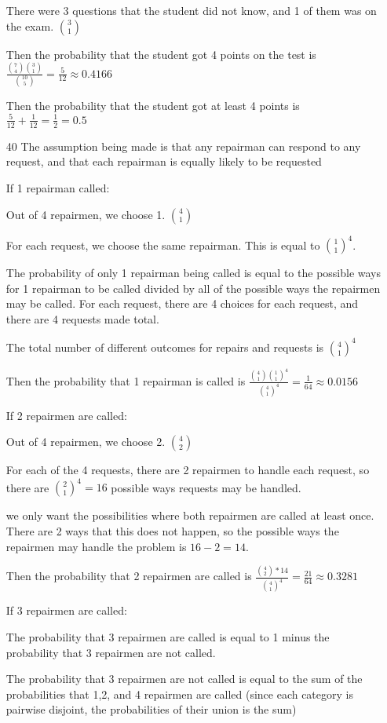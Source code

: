 \documentclass[11pt]{article}
\begin{document}
\begin{itemize}
  There were 3 questions that the student did not know, and 1 of them was on the exam. $\binom{3}{1}$

  Then the probability that the student got 4 points on the test is $\frac{\binom{7}{4}\binom{3}{1}}{\binom{10}{5}} = \frac{5}{12} \approx 0.4166$

  Then the probability that the student got at least 4 points is $\frac{5}{12} + \frac{1}{12} = \frac{1}{2} = 0.5$
\item[40]
  The assumption being made is that any repairman can respond to any request, and that each repairman is equally likely to be requested

  If 1 repairman called:

  Out of 4 repairmen, we choose 1. $\binom{4}{1}$

  For each request, we choose the same repairman. This is equal to ${\binom{1}{1}}^4$.

  The probability of only 1 repairman being called is equal to the possible ways for 1 repairman to be called divided by all of the possible ways the repairmen may be called. For each request, there are 4 choices for each request, and there are 4 requests made total.

  The total number of different outcomes for repairs and requests is ${\binom{4}{1}}^4$

  Then the probability that 1 repairman is called is $\frac{{\binom{4}{1}\binom{1}{1}}^4}{{\binom{4}{1}}^4} = \frac{1}{64} \approx 0.0156$

  If 2 repairmen are called:

  Out of 4 repairmen, we choose 2. $\binom{4}{2}$

  For each of the 4 requests, there are 2 repairmen to handle each request, so there are ${\binom{2}{1}}^4 = 16$ possible ways requests may be handled.

  we only want the possibilities where both repairmen are called at least once. There are 2 ways that this does not happen, so the possible ways the repairmen may handle the problem is $16 - 2 = 14$.

  Then the probability that 2 repairmen are called is $\frac{\binom{4}{2}*14}{{\binom{4}{1}^4}} = \frac{21}{64} \approx 0.3281$

  If 3 repairmen are called: 

  The probability that 3 repairmen are called is equal to 1 minus the probability that 3 repairmen are not called.

  The probability that 3 repairmen are not called is equal to the sum of the probabilities that 1,2, and 4 repairmen are called (since each category is pairwise disjoint, the probabilities of their union is the sum)


\end{itemize}
\end{document}
